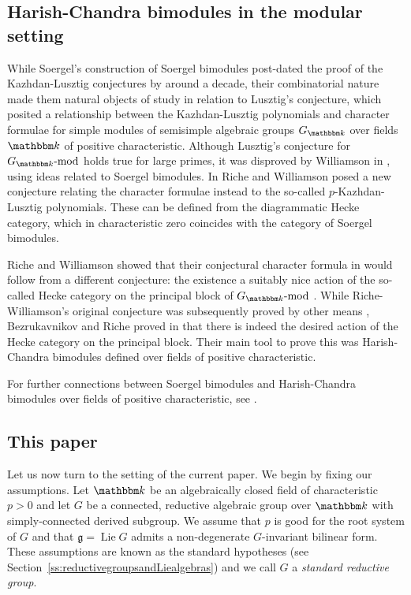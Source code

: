 \documentclass[twoside,12pt,reqno]{amsart}
\theoremstyle{remark}
\numberwithin{equation}{section}
\def\k{{\mathbbm k}}
\def\lmod{\!\operatorname{-mod}}
\def\Lie{\operatorname{Lie}}
\def\g{{\mathfrak g}}
\begin{document}
\subsection{Harish-Chandra bimodules in the modular setting}
 While Soergel's construction of Soergel bimodules post-dated the proof of the Kazhdan-Lusztig conjectures by around a decade, their combinatorial nature made them natural objects of study in relation to Lusztig's conjecture, which posited a relationship between the Kazhdan-Lusztig polynomials and character formulae for simple modules of semisimple algebraic groups $G_\k$ over fields $\k$ of positive characteristic. Although Lusztig's conjecture for $G_\k\lmod$ holds true for large primes, it was disproved by Williamson in \cite{Wi}, using ideas related to Soergel bimodules. In \cite{RW} Riche and Williamson posed a new conjecture relating the character formulae instead to the so-called $p$-Kazhdan-Lusztig polynomials. These can be defined from the diagrammatic Hecke category, which in characteristic zero coincides with the category of Soergel bimodules.

 Riche and Williamson showed that their conjectural character formula in \cite{RW} would follow from a different conjecture: the existence a suitably nice action of the so-called Hecke category on the principal block of $G_\k\lmod$ \cite[Conjecture 1.1]{RW}. While Riche-Williamson's original conjecture was subsequently proved by other means \cite{AMRW}, Bezrukavnikov and Riche proved in \cite{BR} that there is indeed the desired action of the Hecke category on the principal block. Their main tool to prove this was Harish-Chandra bimodules defined over fields of positive characteristic.

For further connections between Soergel bimodules and Harish-Chandra bimodules over fields of positive characteristic, see \cite{BR2, Lo}.

 \subsection{This paper}
 \label{ss:thispaper}

 Let us now turn to the setting of the current paper. We begin by fixing our assumptions. Let $\k$ be an algebraically closed field of characteristic $p > 0$ and let $G$ be a connected, reductive algebraic group over $\k$ with simply-connected derived subgroup. We assume that $p$ is good for the root system of $G$ and that $\g = \Lie G$ admits a non-degenerate $G$-invariant bilinear form. These assumptions are known as the standard hypotheses (see Section~\ref{ss:reductivegroupsandLiealgebras}) and we call $G$ a {\it standard reductive group}.
\end{document}
